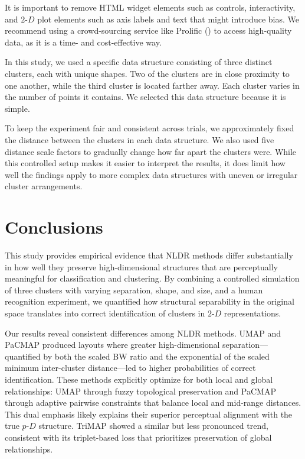 \documentclass[
  11pt,
  a4paper,
]{report}
\newcommand\pD{$p\text{-}D$}
\newcommand\gD{$2\text{-}D$}
\begin{document}
It is important to remove HTML widget elements such as controls,
interactivity, and \gD{} plot elements such as axis labels and text that
might introduce bias. We recommend using a crowd-sourcing service like
Prolific () to access
high-quality data, as it is a time- and cost-effective way.

In this study, we used a specific data structure consisting of three
distinct clusters, each with unique shapes. Two of the clusters are in
close proximity to one another, while the third cluster is located
farther away. Each cluster varies in the number of points it contains.
We selected this data structure because it is simple.

To keep the experiment fair and consistent across trials, we
approximately fixed the distance between the clusters in each data
structure. We also used five distance scale factors to gradually change
how far apart the clusters were. While this controlled setup makes it
easier to interpret the results, it does limit how well the findings
apply to more complex data structures with uneven or irregular cluster
arrangements.

\section{Conclusions}\label{sec-conclusion}

This study provides empirical evidence that NLDR methods differ
substantially in how well they preserve high-dimensional structures that
are perceptually meaningful for classification and clustering. By
combining a controlled simulation of three clusters with varying
separation, shape, and size, and a human recognition experiment, we
quantified how structural separability in the original space translates
into correct identification of clusters in \gD{} representations.

Our results reveal consistent differences among NLDR methods. UMAP and
PaCMAP produced layouts where greater high-dimensional
separation---quantified by both the scaled BW ratio and the exponential
of the scaled minimum inter-cluster distance---led to higher
probabilities of correct identification. These methods explicitly
optimize for both local and global relationships: UMAP through fuzzy
topological preservation and PaCMAP through adaptive pairwise
constraints that balance local and mid-range distances. This dual
emphasis likely explains their superior perceptual alignment with the
true \pD{} structure. TriMAP showed a similar but less pronounced trend,
consistent with its triplet-based loss that prioritizes preservation of
global relationships.
\end{document}

